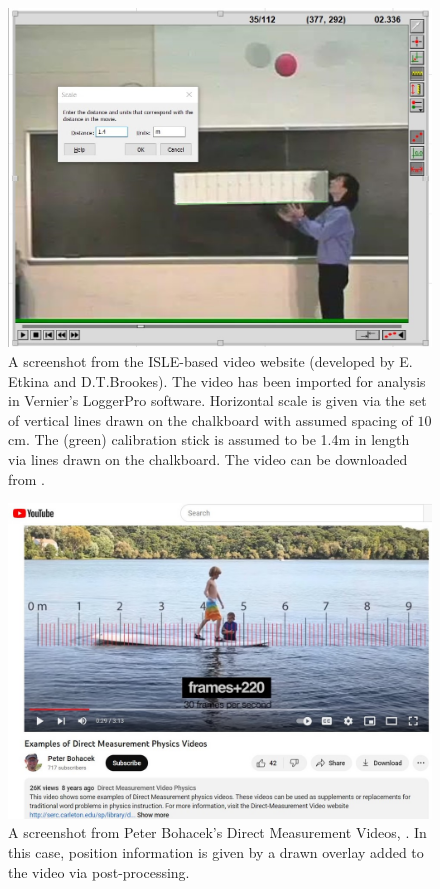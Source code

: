 \documentclass[prb,twocolumn]{revtex4-2}
\begin{document}
\begin{figure}[h]
\centering
\includegraphics[width=\columnwidth]{Etkina-calibration.jpg}
\caption{ 
A screenshot from the ISLE-based video website (developed by E. Etkina and D.T.Brookes).
The video has been imported for analysis in Vernier's LoggerPro software.    
Horizontal  scale is given via the set of vertical lines drawn on the chalkboard with assumed spacing of $10$cm. 
The (green) calibration stick is assumed to be 1.4m in length via lines drawn on the chalkboard.  The video can be downloaded from \cite{ISLE_ball_video_source} .
}
\label{Etkina-calibration}
\end{figure}

\begin{figure}[h]
\centering
\includegraphics[width=\columnwidth]{Bohacek-1.jpg}
\caption{A screenshot from Peter Bohacek's Direct Measurement Videos, \cite{Bohacek_youtube_intro}. In this case, position information is given by a drawn overlay added to the video via post-processing.
}
\label{Bohacek-1}
\end{figure}
\end{document}
